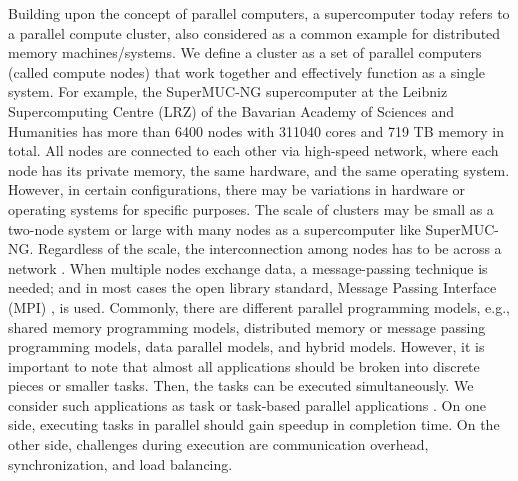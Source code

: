 Building upon the concept of parallel computers, a supercomputer today refers to a parallel compute cluster, also considered as a common example for distributed memory machines/systems. We define a cluster as a set of parallel computers (called compute nodes) that work together and effectively function as a single system. For example, the SuperMUC-NG supercomputer at the Leibniz Supercomputing Centre (LRZ) of the Bavarian Academy of Sciences and Humanities \cite{lrz2020supermucng} has more than 6400 nodes with 311040 cores and 719 TB memory in total. All nodes are connected to each other via high-speed network, where each node has its private memory, the same hardware, and the same operating system. However, in certain configurations, there may be variations in hardware or operating systems for specific purposes. The scale of clusters may be small as a two-node system or large with many nodes as a supercomputer like SuperMUC-NG. Regardless of the scale, the interconnection among nodes has to be across a network \cite{liem1991mddistributed}. When multiple nodes exchange data, a message-passing technique is needed; and in most cases the open library standard, Message Passing Interface (MPI) \cite{gropp1996mpich}, is used. Commonly, there are different parallel programming models, e.g., shared memory programming models, distributed memory or message passing programming models, data parallel models, and hybrid models. However, it is important to note that almost all applications should be broken into discrete pieces or smaller tasks. Then, the tasks can be executed simultaneously. We consider such applications as task or task-based parallel applications \cite{thoman2018taxonomy}. On one side, executing tasks in parallel should gain speedup in completion time. On the other side, challenges during execution are communication overhead, synchronization, and load balancing.\\

